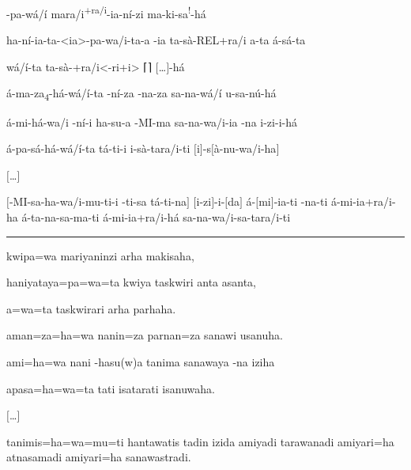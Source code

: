 \clearpage
\setcounter{parcount}{10}
\begin{parnumbersr}

	\raggedright%
	\itshape%


	-pa-wá/í \lmasc{}mara/i\textsuperscript{+ra/i}-ia-ní-zi
	\lmasc{} \lmasc{}ma-ki-sa\textsuperscript{!}-há \lmasc{}\lmasc{}


	\lmasc{}ha-ní-ia-ta-<ia>-pa-wa/i-ta-a \lmasc{}-ia
	\lmasc{}ta-sà-REL+ra/i \lmasc{}a-ta \lmasc{}á-sá-ta


	\lmasc{}wá/í-ta ta-sà-+ra/i<-ri+i>
	 \lmasc{}\textsc{⌈}\textsc{⌉} $[$…$]$-há

	\lmasc{}á-ma\lmasc{}\lmasc{}-za\textsubscript{4}-há-wá/í-ta
	\lmasc{}-ní-za
	\lmasc{}-na-za \lmasc{}sa-na-wá/í
	\lmasc{}u-sa-nú-há

	\lmasc{}á-mi-há-wa/i \lmasc{}-ní-i
	\lmasc{}ha-su-a \lmasc{}-MI-ma
	\lmasc{}\lmasc{} sa-na-wa/i-ia
	\lmasc{}-na i-zi-i-há

	\lmasc{}á-pa-sá-há-wá/í-ta \lmasc{}tá-ti-i
	\lmasc{}i-sà-tara/i-ti
	\lmasc{}$[$i$]$-s$[$à-nu-wa/i-ha$]$

	$[$\ldots$]$

	$[$\lmasc{}-MI-sa-ha-wa/i-mu-ti-i -ti-sa
					\lmasc{}tá-ti-na$]$ \lmasc{}$[$i-zi$]$-i-$[$da$]$
	\lmasc{}á-$[$mi$]$-ia-ti
	\lmasc{}-na-ti \lmasc{}á-mi-ia+ra/i-ha
	\lmasc{}á-ta-na-sa-ma-ti \lmasc{}á-mi-ia+ra/i-há
	\lmasc{}\lmasc{} \lmasc{}sa-na-wa/i-sa-tara/i-ti



\end{parnumbersr}

\vspace{10pt}
\hrule
\vspace{10pt}

\setcounter{parcount}{10}
\begin{parnumbersr}

	\raggedright%
	\itshape%

	kwipa=wa mariyaninzi arha makisaha,

	haniyataya=pa=wa=ta kwiya taskwiri anta asanta,

	a=wa=ta taskwirari arha parhaha.

	aman=za=ha=wa nanin=za parnan=za sanawi usanuha.

	ami=ha=wa nani -hasu{(w)}a tanima sanawaya -na iziha

	apasa=ha=wa=ta tati isatarati isanuwaha.

	$[$\ldots{}$]$

	tanimis=ha=wa=mu=ti hantawatis tadin izida amiyadi tarawanadi amiyari=ha
	atnasamadi amiyari=ha sanawastradi.

\end{parnumbersr}

